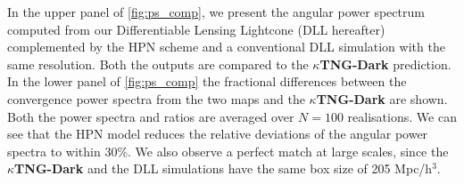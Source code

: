 \documentclass{aa}
\begin{document}
In the upper panel of \autoref{fig:ps_comp}, we present the angular power spectrum computed from our Differentiable Lensing Lightcone (DLL hereafter) complemented by the HPN scheme and a conventional DLL simulation with the same resolution. Both the outputs are compared to the \textbf{$\kappa$TNG-Dark} prediction. In the lower panel  of \autoref{fig:ps_comp} the fractional differences between the convergence power spectra from the two maps and the \textbf{$\kappa$TNG-Dark} are shown.  Both the power spectra and ratios are averaged over $N = 100$ realisations. 
We can see that the HPN  model reduces the relative deviations of the angular power spectra to within 30\%. 
We also observe a perfect match at large scales, since the \textbf{$\kappa$TNG-Dark} and the DLL simulations have the same box size of 205 Mpc/h$^3$.
\end{document}
